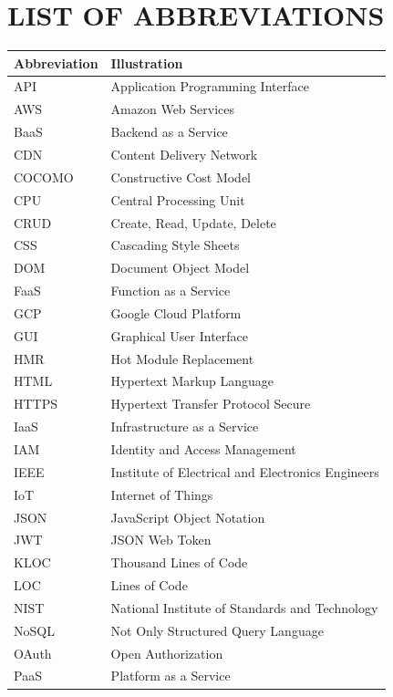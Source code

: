 \documentclass[12pt,a4paper,openany]{report}
\newcommand{\hdr}{\rowcolor{gray!25}}
\begin{document}
\chapter*{LIST OF ABBREVIATIONS}
\begin{longtable}{|p{3.5cm}|p{10cm}|}
\hline
\hdr\textbf{Abbreviation} & \textbf{Illustration} \\ \hline
\endhead
API & Application Programming Interface \\ \hline
AWS & Amazon Web Services \\ \hline
BaaS & Backend as a Service \\ \hline
CDN & Content Delivery Network \\ \hline
COCOMO & Constructive Cost Model \\ \hline
CPU & Central Processing Unit \\ \hline
CRUD & Create, Read, Update, Delete \\ \hline
CSS & Cascading Style Sheets \\ \hline
DOM & Document Object Model \\ \hline
FaaS & Function as a Service \\ \hline
GCP & Google Cloud Platform \\ \hline
GUI & Graphical User Interface \\ \hline
HMR & Hot Module Replacement \\ \hline
HTML & Hypertext Markup Language \\ \hline
HTTPS & Hypertext Transfer Protocol Secure \\ \hline
IaaS & Infrastructure as a Service \\ \hline
IAM & Identity and Access Management \\ \hline
IEEE & Institute of Electrical and Electronics Engineers \\ \hline
IoT & Internet of Things \\ \hline
JSON & JavaScript Object Notation \\ \hline
JWT & JSON Web Token \\ \hline
KLOC & Thousand Lines of Code \\ \hline
LOC & Lines of Code \\ \hline
NIST & National Institute of Standards and Technology \\ \hline
NoSQL & Not Only Structured Query Language \\ \hline
OAuth & Open Authorization \\ \hline
PaaS & Platform as a Service \\ \hline

\end{longtable}
\end{document}
